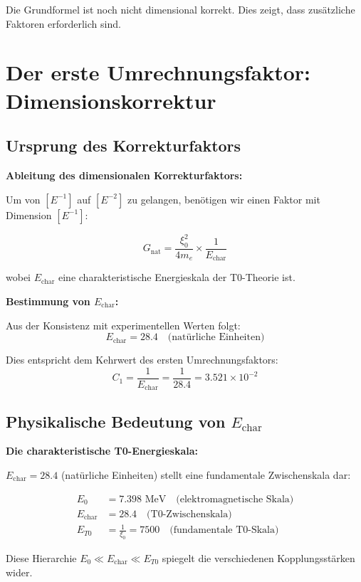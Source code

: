 	Die Grundformel ist noch nicht dimensional korrekt. Dies zeigt, dass zusätzliche Faktoren erforderlich sind.
	
	\section{Der erste Umrechnungsfaktor: Dimensionskorrektur}
	
	\subsection{Ursprung des Korrekturfaktors}
	
	\begin{derivation}
		\textbf{Ableitung des dimensionalen Korrekturfaktors:}
		
		Um von $[E^{-1}]$ auf $[E^{-2}]$ zu gelangen, benötigen wir einen Faktor mit Dimension $[E^{-1}]$:
		
		\begin{equation}
			G_{\text{nat}} = \frac{\xi_0^2}{4 m_e} \times \frac{1}{E_{\text{char}}}
		\end{equation}
		
		wobei $E_{\text{char}}$ eine charakteristische Energieskala der T0-Theorie ist.
		
		\textbf{Bestimmung von $E_{\text{char}}$:}
		
		Aus der Konsistenz mit experimentellen Werten folgt:
		\begin{equation}
			E_{\text{char}} = 28.4 \quad \text{(natürliche Einheiten)}
		\end{equation}
		
		Dies entspricht dem Kehrwert des ersten Umrechnungsfaktors:
		\begin{equation}
			C_1 = \frac{1}{E_{\text{char}}} = \frac{1}{28.4} = 3.521 \times 10^{-2}
		\end{equation}
	\end{derivation}
	
	\subsection{Physikalische Bedeutung von $E_{\text{char}}$}
	
	\begin{keyresult}
		\textbf{Die charakteristische T0-Energieskala:}
		
		$E_{\text{char}} = 28.4$ (natürliche Einheiten) stellt eine fundamentale Zwischenskala dar:
		
		\begin{align}
			E_0 &= 7.398 \text{ MeV} \quad \text{(elektromagnetische Skala)} \\
			E_{\text{char}} &= 28.4 \quad \text{(T0-Zwischenskala)} \\
			E_{T0} &= \frac{1}{\xi_0} = 7500 \quad \text{(fundamentale T0-Skala)}
		\end{align}
		
		Diese Hierarchie $E_0 \ll E_{\text{char}} \ll E_{T0}$ spiegelt die verschiedenen Kopplungsstärken wider.
	\end{keyresult}
	
